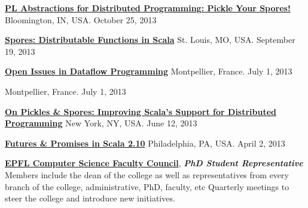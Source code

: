 \documentclass[9pt]{article}
\begin{document}
\noindent\href{http://heather.miller.am/files/IU-PL-Abstractions-for-Dist-Programming.pdf}{\bf PL Abstractions for Distributed Programming: Pickle Your Spores!} 
\linebreak\noindent Bloomington, IN, USA. October 25, 2013
\bigskip


\noindent\href{https://speakerdeck.com/heathermiller/spores-distributable-functions-in-scala}{\bf Spores: Distributable Functions in Scala} 
\noindent\linebreak St. Louis, MO, USA. September 19, 2013
\medskip

\noindent\href{http://heather.miller.am/files/LaME2013-Dataflow.pdf}{\bf Open Issues in Dataflow Programming} 
\linebreak\noindent Montpellier, France. July 1, 2013
\medskip

 
\linebreak\noindent Montpellier, France. July 1, 2013
\medskip

\noindent\href{https://speakerdeck.com/heathermiller/on-pickles-and-spores-improving-support-for-distributed-programming-in-scala}{\bf On Pickles \& Spores: Improving Scala's Support for Distributed Programming} \vspace{-0.03in}
\noindent\linebreak New York, NY, USA. June 12, 2013
\medskip

\noindent\href{http://lampwww.epfl.ch/~hmiller/files/Futures-Try-PhillyETE.pdf}{\bf Futures \& Promises in Scala 2.10} 
\linebreak\noindent Philadelphia, PA, USA. April 2, 2013
\bigskip

\medskip
{}

\noindent \href{http://ic.epfl.ch/conseil-de-faculte}{\bf EPFL Computer Science Faculty Council}, {\bf \em PhD Student Representative} 
\newline\noindent Members include the dean of the college as well as representatives from every branch of the college, administrative, PhD, faculty, etc Quarterly meetings to steer the college and introduce new initiatives.
\medskip
\end{document}
